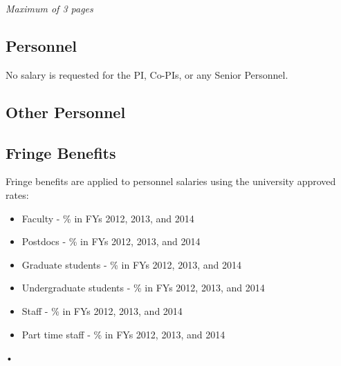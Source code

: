 
\renewcommand{\thepage}{f. Budget Justification - Page \arabic{page} of 1}

\begin{center}
\emph{Maximum of 3 pages}
\end{center}

\subsection*{Personnel}

No salary is requested for the PI, Co-PIs, or any Senior Personnel.

\subsection*{Other Personnel}

\subsection*{Fringe Benefits}
Fringe benefits are applied to personnel salaries using the university approved rates:
\begin{itemize}
\item Faculty - \% in FYs 2012, 2013, and 2014
\item Postdocs - \% in FYs 2012, 2013, and 2014
\item Graduate students - \% in FYs 2012, 2013, and 2014
\item Undergraduate students - \% in FYs 2012, 2013, and 2014
\item Staff - \% in FYs 2012, 2013, and 2014
\item Part time staff - \% in FYs 2012, 2013, and 2014
\end{itemize}•


